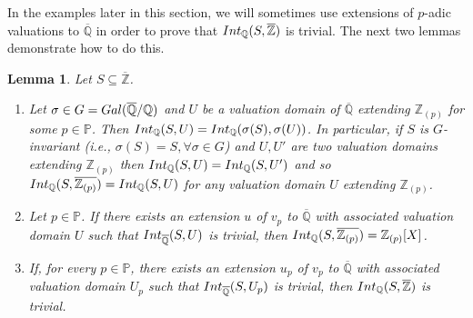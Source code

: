 \documentclass{article}
\newtheorem{Lem}[equation]{Lemma}
\theoremstyle{definition}\newtheorem{Def}[equation]{Definition}
\theoremstyle{definition}\newtheorem{Ques}[equation]{Question}
\theoremstyle{definition}\newtheorem{Conj}[equation]{Conjecture}
\theoremstyle{definition}\newtheorem{Not}[equation]{Notation}
\newcommand{\Q}{\mathbb{Q}}
\newcommand{\oQ}{\overline{\Q}}
\newcommand{\oZ}{\overline{\Z}}
\newcommand{\Z}{\mathbb{Z}}
\newcommand{\Int}{\textnormal{Int}}
\newcommand{\IntQ}{\Int_{\Q}}
\newcommand{\PP}{\mathbb{P}}
\newcommand{\rc}{ \color{red}}
\numberwithin{equation}{section}
\begin{document}
In the examples later in this section, we will sometimes use extensions of $p$-adic valuations to $\oQ$ in order to prove that $\IntQ(S,\oZ)$ is trivial. The next two lemmas demonstrate how to do this.


\begin{Lem}\label{Extensions to Qbar lemma 1}
Let $S \subseteq \oZ$.
\begin{enumerate}[(1)]
\item Let $\sigma\in G={\rm Gal}(\oQ/\Q)$ and $U$ be a valuation domain of $\oQ$ extending $\Z_{(p)}$ for some $p\in\PP$. Then $\IntQ(S,U)=\IntQ(\sigma(S),\sigma(U))$. In particular, if $S$ is $G$-invariant (i.e., $\sigma(S)=S,\forall\sigma\in G$) and $U,U'$ are two valuation domains extending $\Z_{(p)}$ then $\IntQ(S,U)=\IntQ(S,U')$ and so $\IntQ(S,\overline{\Z_{(p)}})=\IntQ(S,U)$ for any valuation domain $U$ extending $\Z_{(p)}$.

\item Let $p \in \PP$. If there exists an extension $u$ of $v_p$ to $\oQ$ with associated valuation domain $U$ such that $\Int_{\oQ}(S,U)$ is trivial, then $\IntQ(S,\overline{\Z_{(p)}}) = \Z_{(p)}[X]$.
\item If, for every $p \in \PP$, there exists an extension $u_p$ of $v_p$ to $\oQ$ with associated valuation domain $U_p$ such that $\Int_{\oQ}(S,U_p)$ is trivial, then $\IntQ(S,\oZ)$ is trivial.
\end{enumerate}
\end{Lem}
\end{document}
